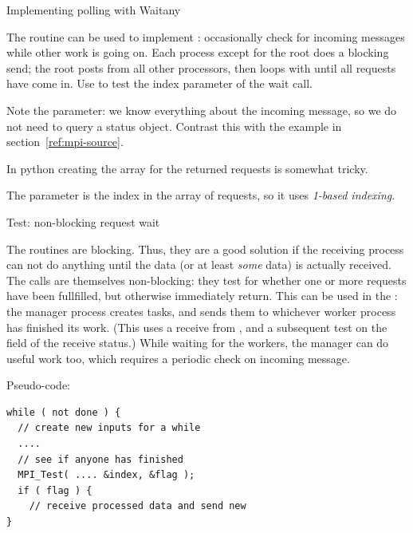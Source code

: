  {Implementing polling with Waitany}

The  routine can be used to implement
: occasionally check for incoming messages while
other work is going on.
%
%
%
Each process except for the root does a blocking send; the root
posts  from all other processors, then loops
with  until all requests have come in. Use
 to test the index parameter of the wait
call.

Note the  parameter: we know everything
about the incoming message, so we do not need to query a status object.
Contrast this with the example in section~\ref{ref:mpi-source}.

\begin{pythonnote}
  In python creating the array for the returned requests is somewhat
  tricky.
\end{pythonnote}

\begin{fortrannote}
  The  parameter is the index in the array of requests,
  so it uses \emph{1-based indexing}.
\end{fortrannote}

 {Test: non-blocking request wait}
\label{sec:mpi-test}

The  routines are blocking. Thus, they are a good solution if 
the receiving process can not do anything until the data 
(or at least \emph{some} data) is actually received.
The  calls are themselves non-blocking: they
test for whether one or more requests have been
fullfilled, but otherwise immediately return.
This can be used in the
: the manager process creates tasks, and
sends them to whichever worker process has finished its work.
(This uses a receive from , and a
subsequent test on the  field of the receive status.)
While waiting for the workers, the manager can do useful work too,
which requires a periodic check on incoming message.

Pseudo-code:
\begin{lstlisting}
while ( not done ) {
  // create new inputs for a while
  ....
  // see if anyone has finished
  MPI_Test( .... &index, &flag );
  if ( flag ) {
    // receive processed data and send new
}
\end{lstlisting}

